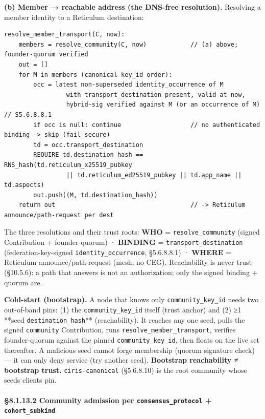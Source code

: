 \documentclass[10pt]{article}
\begin{document}
\textbf{(b) Member → reachable address (the DNS-free resolution).} Resolving a member identity to a Reticulum destination:


\begin{lstlisting}
resolve_member_transport(C, now):
    members = resolve_community(C, now)            // (a) above; founder-quorum verified
    out = []
    for M in members (canonical key_id order):
        occ = latest non-superseded identity_occurrence of M
                 with transport_destination present, valid at now,
                 hybrid-sig verified against M (or an occurrence of M)   // S5.6.8.8.1
        if occ is null: continue                   // no authenticated binding -> skip (fail-secure)
        td = occ.transport_destination
        REQUIRE td.destination_hash == RNS_hash(td.reticulum_x25519_pubkey
                 || td.reticulum_ed25519_pubkey || td.app_name || td.aspects)
        out.push((M, td.destination_hash))
    return out                                     // -> Reticulum announce/path-request per dest
\end{lstlisting}

The three resolutions and their trust roots: \textbf{WHO} = \texttt{resolve\_community} (signed Contribution + founder-quorum) · \textbf{BINDING} = \texttt{transport\_destination} (federation-key-signed \texttt{identity\_occurrence}, §5.6.8.8.1) · \textbf{WHERE} = Reticulum announce/path-request (mesh, no CEG). Reachability is never trust (§10.5.6): a path that answers is not an authorization; only the signed binding + quorum are.


\textbf{Cold-start (bootstrap).} A node that knows only \texttt{community\_key\_id} needs two out-of-band pins: (1) the \texttt{community\_key\_id} itself (trust anchor) and (2) ≥1 **seed \texttt{destination\_hash}** (reachability). It reaches any one seed, pulls the signed \texttt{community} Contribution, runs \texttt{resolve\_member\_transport}, verifies founder-quorum against the pinned \texttt{community\_key\_id}, then floats on the live set thereafter. A malicious seed cannot forge membership (quorum signature check) — it can only deny service (try another seed). \textbf{Bootstrap reachability ≠ bootstrap trust.} \texttt{ciris-canonical} (§5.6.8.10) is the root community whose seeds clients pin.


\paragraph{§8.1.13.2 Community admission per \texttt{consensus\_protocol} + \texttt{cohort\_subkind}}\mbox{}\\
\end{document}
